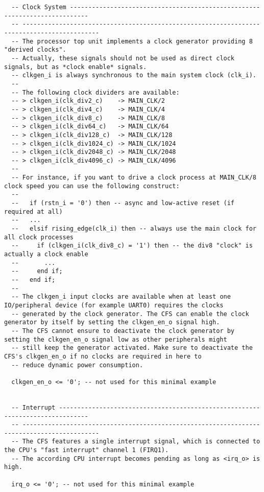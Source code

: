 \begin{code}
\begin{verbatim}
  -- Clock System ---------------------------------------------------------------------------
  -- -------------------------------------------------------------------------------------------
  -- The processor top unit implements a clock generator providing 8 "derived clocks".
  -- Actually, these signals should not be used as direct clock signals, but as *clock enable* signals.
  -- clkgen_i is always synchronous to the main system clock (clk_i).
  --
  -- The following clock dividers are available:
  -- > clkgen_i(clk_div2_c)    -> MAIN_CLK/2
  -- > clkgen_i(clk_div4_c)    -> MAIN_CLK/4
  -- > clkgen_i(clk_div8_c)    -> MAIN_CLK/8
  -- > clkgen_i(clk_div64_c)   -> MAIN_CLK/64
  -- > clkgen_i(clk_div128_c)  -> MAIN_CLK/128
  -- > clkgen_i(clk_div1024_c) -> MAIN_CLK/1024
  -- > clkgen_i(clk_div2048_c) -> MAIN_CLK/2048
  -- > clkgen_i(clk_div4096_c) -> MAIN_CLK/4096
  --
  -- For instance, if you want to drive a clock process at MAIN_CLK/8 clock speed you can use the following construct:
  --
  --   if (rstn_i = '0') then -- async and low-active reset (if required at all)
  --   ...
  --   elsif rising_edge(clk_i) then -- always use the main clock for all clock processes
  --     if (clkgen_i(clk_div8_c) = '1') then -- the div8 "clock" is actually a clock enable
  --       ...
  --     end if;
  --   end if;
  --
  -- The clkgen_i input clocks are available when at least one IO/peripheral device (for example UART0) requires the clocks
  -- generated by the clock generator. The CFS can enable the clock generator by itself by setting the clkgen_en_o signal high.
  -- The CFS cannot ensure to deactivate the clock generator by setting the clkgen_en_o signal low as other peripherals might
  -- still keep the generator activated. Make sure to deactivate the CFS's clkgen_en_o if no clocks are required in here to
  -- reduce dynamic power consumption.

  clkgen_en_o <= '0'; -- not used for this minimal example


  -- Interrupt ------------------------------------------------------------------------------
  -- -------------------------------------------------------------------------------------------
  -- The CFS features a single interrupt signal, which is connected to the CPU's "fast interrupt" channel 1 (FIRQ1).
  -- The according CPU interrupt becomes pending as long as <irq_o> is high.

  irq_o <= '0'; -- not used for this minimal example



\end{verbatim}
\end{code}
